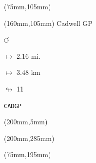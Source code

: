\begin{textblock*}{80mm}(75mm,105mm)%
\end{textblock*}
\begin{textblock*}{40mm}(160mm,105mm)%
Cadwell GP
\par \Huge$\circlearrowleft$
\Large
\par$\mapsto$ 2.16 mi.
\par$\mapsto$ 3.48 km
\par$\looparrowright$ 11
\par\hfill\tiny\tt CADGP\\
\end{textblock*}
\begin{textblock*}{20mm}(200mm,5mm)%
\fbox{\thepage}
\end{textblock*}
\begin{textblock*}{20mm}(200mm,285mm)%
\fbox{\thepage}
\end{textblock*}
\begin{textblock*}{80mm}(75mm,195mm)%
\end{textblock*}
